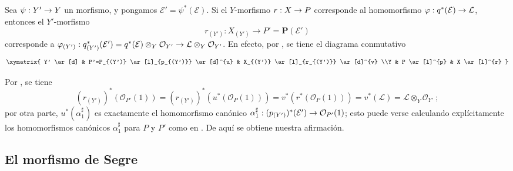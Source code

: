 \documentclass[oneside,10pt]{amsart}
\makeatletter
\newcommand{\ega@arrow}[2]{\mathchoice{#1}{#2}{#2}{#2}}
\renewcommand{\to}{\ega@arrow{\longrightarrow}{\rightarrow}}
\let\EGAOriginalLabel\label
\renewcommand{\label}[1]{\phantomsection\EGAOriginalLabel{#1}}
\makeatother
\begin{document}
\begin{env}[4.2.10]
\label{II.4.2.10-fr}
Sea $\psi:Y'\to Y$ un morfismo, y pongamos $\mathcal{E}'=\psi^*(\mathcal{E})$.
Si el $Y$-morfismo $r:X\to P$ corresponde al homomorfismo $\varphi:q^*(\mathcal{E})\to\mathcal{L}$, entonces el $Y'$-morfismo
\[
  r_{(Y')}:X_{(Y')}\longrightarrow P'=\mathbf{P}(\mathcal{E}')
\]
corresponde a $\varphi_{(Y')}:q_{(Y')}^*(\mathcal{E}')=
  q^*(\mathcal{E})\otimes_Y\mathcal{O}_{Y'}\to
\mathcal{L}\otimes_Y\mathcal{O}_{Y'}$.
En efecto, por , se tiene el diagrama conmutativo
\[
  \xymatrix{
    Y' \ar[d]
    & P'=P_{(Y')} \ar[l]_{p_{(Y')}} \ar[d]^{u}
    & X_{(Y')} \ar[l]_{r_{(Y')}} \ar[d]^{v}
    \\Y
    & P \ar[l]^{p}
    & X \ar[l]^{r}
  }
\]

Por , se tiene
\[
  (r_{(Y')})^*(\mathcal{O}_{P'}(1))
  =(r_{(Y')})^*(u^*(\mathcal{O}_P(1)))
  =v^*(r^*(\mathcal{O}_P(1)))
  =v^*(\mathcal{L})=\mathcal{L}\otimes_Y\mathcal{O}_{Y'}~;
\]
por otra parte, $u^*(\alpha_1^\sharp)$ es exactamente el homomorfismo canónico $\alpha_1^\sharp:(p_{(Y')})^*(\mathcal{E}')\to\mathcal{O}_{P'}(1)$;
esto puede verse calculando explícitamente los homomorfismos canónicos $\alpha_1^\sharp$ para $P$ y $P'$ como en .
De aquí se obtiene nuestra afirmación.
\end{env}

\subsection{El morfismo de Segre}
\label{subsection:II.4.3-fr}
\end{document}

